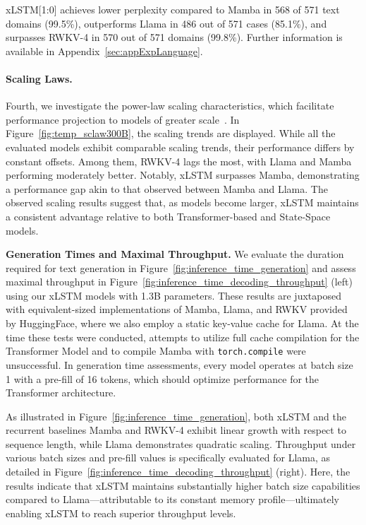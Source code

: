 xLSTM[1:0] achieves lower perplexity compared to Mamba in 568 of 571 text domains (99.5\%), outperforms Llama in 486 out of 571 cases (85.1\%), and surpasses RWKV-4 in 570 out of 571 domains (99.8\%). Further information is available in Appendix~\ref{sec:appExpLanguage}.

\paragraph{Scaling Laws.} Fourth, we investigate the power-law scaling characteristics, which facilitate performance projection to models of greater scale~\citep{Kaplan:20,Brown:20short}.
In Figure~\ref{fig:temp_sclaw300B}, the scaling trends are displayed. While all the evaluated models exhibit comparable scaling trends, their performance differs by constant offsets. Among them, RWKV-4 lags the most, with Llama and Mamba performing moderately better. Notably, xLSTM surpasses Mamba, demonstrating a performance gap akin to that observed between Mamba and Llama. The observed scaling results suggest that, as models become larger, xLSTM maintains a consistent advantage relative to both Transformer-based and State-Space models.

\textbf{Generation Times and Maximal Throughput.} We evaluate the duration required for text generation in Figure~\ref{fig:inference_time_generation} and assess maximal throughput in Figure~\ref{fig:inference_time_decoding_throughput} (left) using our xLSTM models with 1.3B parameters. These results are juxtaposed with equivalent-sized implementations of Mamba, Llama, and RWKV provided by HuggingFace, where we also employ a static key-value cache for Llama. At the time these tests were conducted, attempts to utilize full cache compilation for the Transformer Model and to compile Mamba with \texttt{torch.compile} were unsuccessful. In generation time assessments, every model operates at batch size 1 with a pre-fill of 16 tokens, which should optimize performance for the Transformer architecture.

As illustrated in Figure~\ref{fig:inference_time_generation}, both xLSTM and the recurrent baselines Mamba and RWKV-4 exhibit linear growth with respect to sequence length, while Llama demonstrates quadratic scaling. Throughput under various batch sizes and pre-fill values is specifically evaluated for Llama, as detailed in Figure~\ref{fig:inference_time_decoding_throughput} (right). Here, the results indicate that xLSTM maintains substantially higher batch size capabilities compared to Llama—attributable to its constant memory profile—ultimately enabling xLSTM to reach superior throughput levels.

